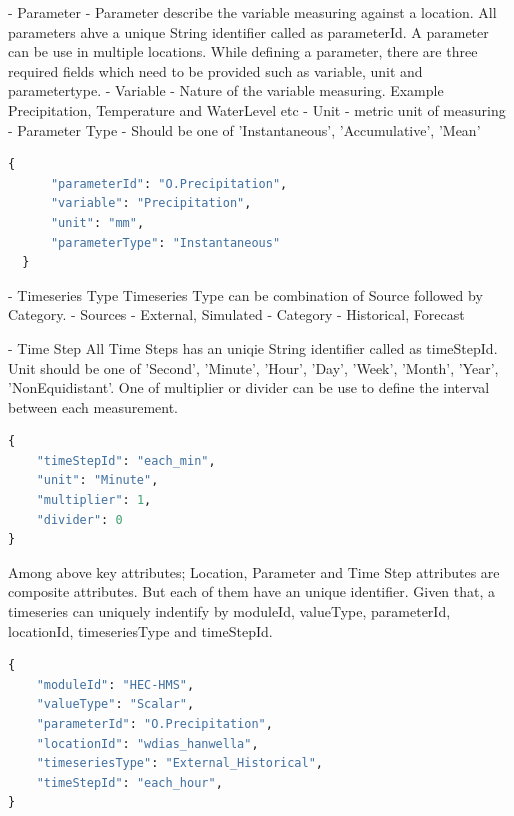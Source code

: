 - Parameter - Parameter describe the variable measuring against a location. All parameters ahve a unique String identifier called as parameterId. A parameter can be use in multiple locations.
While defining a parameter, there are three required fields which need to be provided such as variable, unit and parametertype.
- Variable - Nature of the variable measuring. Example Precipitation, Temperature and WaterLevel etc
- Unit - metric unit of measuring
- Parameter Type - Should be one of 'Instantaneous', 'Accumulative', 'Mean'
  \begin{lstlisting}[language=Python]
  {
      "parameterId": "O.Precipitation",
      "variable": "Precipitation",
      "unit": "mm",
      "parameterType": "Instantaneous"
  }
  \end{lstlisting}

- Timeseries Type
Timeseries Type can be combination of Source followed by Category.
  - Sources - External, Simulated
  - Category - Historical, Forecast

- Time Step
All Time Steps has an uniqie String identifier called as timeStepId. Unit should be one of 'Second', 'Minute', 'Hour', 'Day', 'Week', 'Month', 'Year', 'NonEquidistant'. One of multiplier or divider can be use to define the interval between each measurement.
\begin{lstlisting}[language=Python]
{
    "timeStepId": "each_min",
    "unit": "Minute",
    "multiplier": 1,
    "divider": 0
}
\end{lstlisting}

Among above key attributes; Location, Parameter and Time Step attributes are composite attributes. But each of them have an unique identifier.
Given that, a timeseries can uniquely indentify by moduleId, valueType, parameterId, locationId, timeseriesType and timeStepId.
\begin{lstlisting}[language=Python]
{
	"moduleId": "HEC-HMS",
	"valueType": "Scalar",
	"parameterId": "O.Precipitation",
	"locationId": "wdias_hanwella",
	"timeseriesType": "External_Historical",
	"timeStepId": "each_hour",
}
\end{lstlisting}

